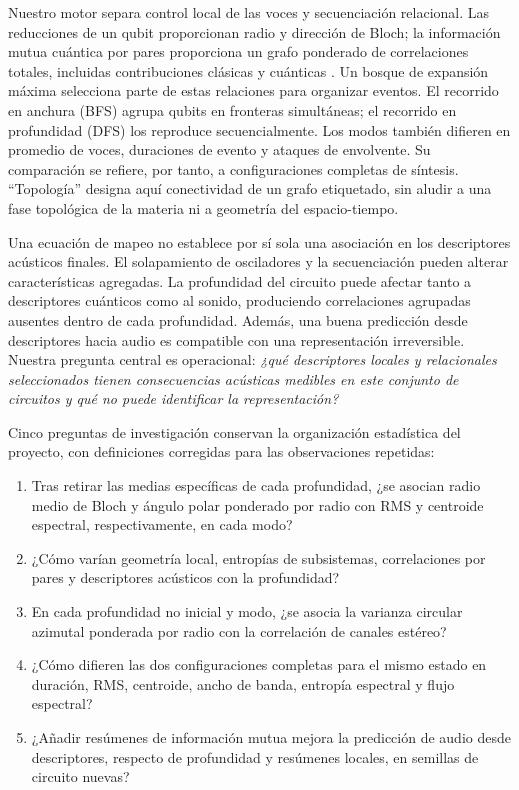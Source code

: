 \documentclass[pdflatex,iicol,sn-basic,Numbered]{sn-jnl}
\begin{document}
Nuestro motor separa control local de las voces y secuenciación relacional. Las reducciones de un qubit proporcionan radio y dirección de Bloch; la información mutua cuántica por pares proporciona un grafo ponderado de correlaciones totales, incluidas contribuciones clásicas y cuánticas \citep{Groisman2005}. Un bosque de expansión máxima selecciona parte de estas relaciones para organizar eventos. El recorrido en anchura (BFS) agrupa qubits en fronteras simultáneas; el recorrido en profundidad (DFS) los reproduce secuencialmente. Los modos también difieren en promedio de voces, duraciones de evento y ataques de envolvente. Su comparación se refiere, por tanto, a configuraciones completas de síntesis. ``Topología'' designa aquí conectividad de un grafo etiquetado, sin aludir a una fase topológica de la materia ni a geometría del espacio-tiempo.

Una ecuación de mapeo no establece por sí sola una asociación en los descriptores acústicos finales. El solapamiento de osciladores y la secuenciación pueden alterar características agregadas. La profundidad del circuito puede afectar tanto a descriptores cuánticos como al sonido, produciendo correlaciones agrupadas ausentes dentro de cada profundidad. Además, una buena predicción desde descriptores hacia audio es compatible con una representación irreversible. Nuestra pregunta central es operacional: \emph{¿qué descriptores locales y relacionales seleccionados tienen consecuencias acústicas medibles en este conjunto de circuitos y qué no puede identificar la representación?}

Cinco preguntas de investigación conservan la organización estadística del proyecto, con definiciones corregidas para las observaciones repetidas:
\begin{enumerate}
\item[\textbf{RQ1.}] Tras retirar las medias específicas de cada profundidad, ¿se asocian radio medio de Bloch y ángulo polar ponderado por radio con RMS y centroide espectral, respectivamente, en cada modo?
\item[\textbf{RQ2.}] ¿Cómo varían geometría local, entropías de subsistemas, correlaciones por pares y descriptores acústicos con la profundidad?
\item[\textbf{RQ3.}] En cada profundidad no inicial y modo, ¿se asocia la varianza circular azimutal ponderada por radio con la correlación de canales estéreo?
\item[\textbf{RQ4.}] ¿Cómo difieren las dos configuraciones completas para el mismo estado en duración, RMS, centroide, ancho de banda, entropía espectral y flujo espectral?
\item[\textbf{RQ5.}] ¿Añadir resúmenes de información mutua mejora la predicción de audio desde descriptores, respecto de profundidad y resúmenes locales, en semillas de circuito nuevas?
\end{enumerate}
\end{document}
